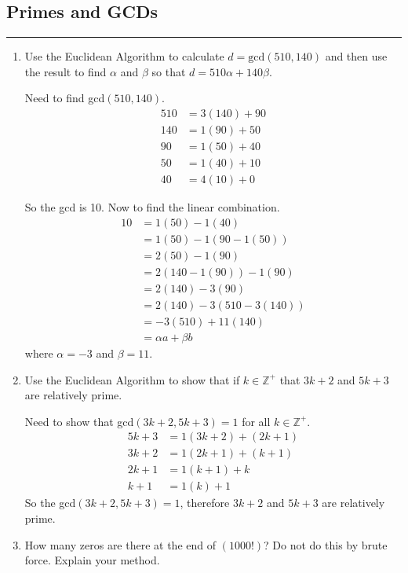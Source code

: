 \documentclass[class=article, crop=false]{standalone}
\def\integers{{\mathbb Z}}
\begin{document}
\subsection{Primes and GCDs}
\hfill {}
\rule{\textwidth}{1pt}
\begin{enumerate}
\item
 Use the Euclidean Algorithm to calculate $d=\mbox{gcd}(510,140)$
  and then use the result to find $\alpha$ and $\beta$ so
  that $d=510\alpha+140\beta$.\hfill{}

  Need to find gcd$(510,140)$.
  \begin{align*}
	510 &= 3(140) + 90 \\
	140 &= 1(90) + 50 \\
	90 &= 1(50) + 40 \\
	50 &= 1(40) + 10 \\
	40 &= 4(10) + 0
  \end{align*}

  So the gcd is 10. Now to find the linear combination.
  \begin{align*}
	10 &= 1(50) - 1(40) \\
	&= 1(50) - 1(90-1(50)) \\
	&= 2(50) - 1(90) \\
	&= 2(140-1(90)) - 1(90) \\
	&= 2(140) -3(90) \\
	&= 2(140) -3(510-3(140)) \\
	&= -3(510) +11(140) \\
	&= \alpha a+ \beta b
  \end{align*}
  where $\alpha = -3$ and $\beta = 11$.

\item
  Use the Euclidean Algorithm to show that if $k\in\integers^+$ that
  $3k+2$ and $5k+3$ are relatively prime.\hfill{}

  Need to show that gcd$(3k+2, 5k+3)=1$ for all $k\in\integers^+$.
  \begin{align*}
	5k+3 &= 1(3k+2) + (2k+1) \\
	3k+2 &= 1(2k+1) + (k+1) \\
	2k+1 &= 1(k+1) + k \\
	k+1 &= 1(k) + 1
  \end{align*}
  So the gcd$(3k+2,5k+3)=1$, therefore $3k+2$ and $5k+3$ are relatively prime.

\item
  How many zeros are there at the end of $(1000!)$?  Do not do this
  by brute force.  Explain your method.\hfill{}


\end{enumerate}
\end{document}
